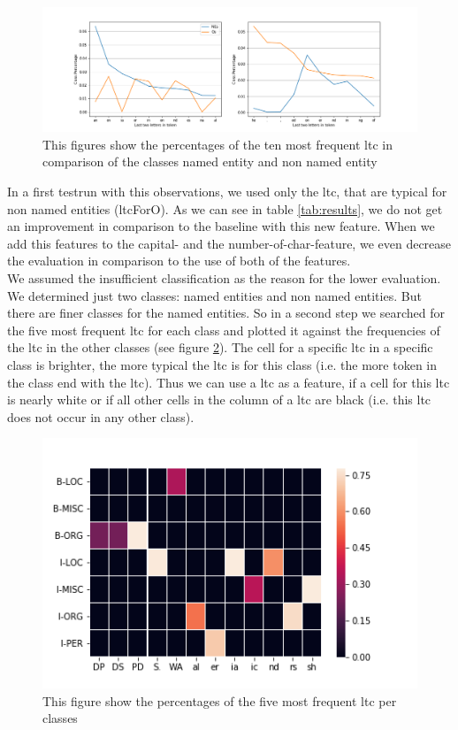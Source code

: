 \documentclass[noindent, nochapname]{tudexercise}
\begin{document}
			\begin{figure}[h]
				\centering
				\includegraphics[scale=0.5]{img/last_two_letters_comparison.png}
				\caption{This figures show the percentages of the ten most frequent ltc in comparison of the classes named entity and non named entity}
				\label{fig:ten_most_frequent_comparison}
			\end{figure}
						
			In a first testrun with this observations, we used only the ltc, that are typical for non named entities (ltcForO). As we can see in table \ref{tab:results}, we do not get an improvement in comparison to the baseline with this new feature. When we add this features to the capital- and the number-of-char-feature, we even decrease the evaluation in comparison to the use of both of the features.\\
			
			We assumed the insufficient classification as the reason for the lower evaluation. We determined just two classes: named entities and non named entities. But there are finer classes for the named entities. So in a second step we searched for the five most frequent ltc for each class and plotted it against the frequencies of the ltc in the other classes (see figure \ref{fig:ltc_for_all_classes}). The cell for a specific ltc in a specific class is brighter, the more typical the ltc is for this class (i.e. the more token in the class end with the ltc). Thus we can use a ltc as a feature, if a cell for this ltc is nearly white or if all other cells in the column of a ltc are black (i.e. this ltc does not occur in any other class).
			
			\begin{figure}[h]
				\centering
				\includegraphics[scale=0.6]{img/ltc_all_classes.png}
				\caption{This figure show the percentages of the five most frequent ltc per classes}
				\label{fig:ltc_for_all_classes}
			\end{figure}
		
\end{document}
